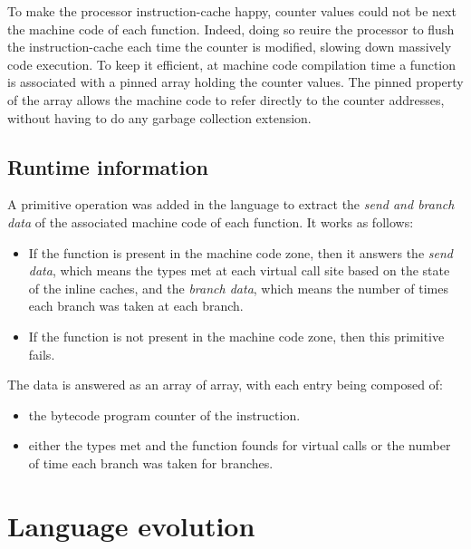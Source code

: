 \documentclass[a4paper,12pt,twoside]{../includes/ThesisStyle}
\begin{document}
To make the processor instruction-cache happy, counter values could not be next the machine code of each function. Indeed, doing so reuire the processor to flush the instruction-cache each time the counter is modified, slowing down massively code execution. To keep it efficient, at machine code compilation time a function is associated with a pinned array holding the counter values. The pinned property of the array allows the machine code to refer directly to the counter addresses, without having to do any garbage collection extension.

\subsection{Runtime information}

A primitive operation was added in the language to extract the \emph{send and branch data} of the associated machine code of each function. It works as follows:
\begin{itemize}
\item If the function is present in the machine code zone, then it answers the \emph{send data}, which means the types met at each virtual call site based on the state of the inline caches, and the \emph{branch data}, which means the number of times each branch was taken at each branch.
\item If the function is not present in the machine code zone, then this primitive fails.
\end{itemize}

The data is answered as an array of array, with each entry being composed of:
\begin{itemize}
\item the bytecode program counter of the instruction.
\item either the types met and the function founds for virtual calls or the number of time each branch was taken for branches.
\end{itemize}




\section{Language evolution}
\end{document}
